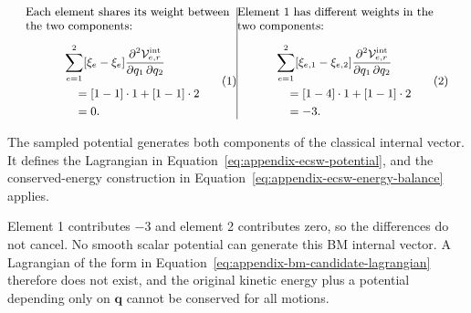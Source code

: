 \documentclass[a4paper,12pt]{article}
\newcommand{\vect}[1]{\boldsymbol{#1}}
\begin{document}
\begin{subequations}
 \label{eq:appendix-structural-compatibility-comparison}
 \noindent
 \begin{minipage}[t]{0.48\linewidth}
  \vspace{0pt}\small\raggedright
  Each element shares its weight between the two components:
  \begin{equation}
   \begin{aligned}
    &\sum_{e=1}^{2}[\xi_e-\xi_e]
      \frac{\partial^2\mathcal V_{e,r}^{\mathrm{int}}}
           {\partial q_1\,\partial q_2}\\
    &\quad=[1-1]\cdot1+[1-1]\cdot2\\
    &\quad=0.
   \end{aligned}
   \label{eq:appendix-structural-classical-compatibility}
  \end{equation}
 \end{minipage}\hfill\vrule width 0.4pt\hfill%
 \begin{minipage}[t]{0.48\linewidth}
  \vspace{0pt}\small\raggedright
  Element 1 has different weights in the two components:
  \begin{equation}
   \begin{aligned}
    &\sum_{e=1}^{2}[\xi_{e,1}-\xi_{e,2}]
      \frac{\partial^2\mathcal V_{e,r}^{\mathrm{int}}}
           {\partial q_1\,\partial q_2}\\
    &\quad=[1-4]\cdot1+[1-1]\cdot2\\
    &\quad=-3.
   \end{aligned}
   \label{eq:appendix-structural-example-compatibility}
  \end{equation}
 \end{minipage}
\end{subequations}

\noindent
\begin{minipage}[t]{0.48\linewidth}
 \vspace{0pt}\small\raggedright
 The sampled potential generates both components of the classical internal vector. It defines the Lagrangian in Equation~\eqref{eq:appendix-ecsw-potential}, and the conserved-energy construction in Equation~\eqref{eq:appendix-ecsw-energy-balance} applies.
\end{minipage}\hfill\vrule width 0.4pt\hfill%
\begin{minipage}[t]{0.48\linewidth}
 \vspace{0pt}\small\raggedright
 Element 1 contributes $-3$ and element 2 contributes zero, so the differences do not cancel. No smooth scalar potential can generate this BM internal vector. A Lagrangian of the form in Equation~\eqref{eq:appendix-bm-candidate-lagrangian} therefore does not exist, and the original kinetic energy plus a potential depending only on $\vect{q}$ cannot be conserved for all motions.
\end{minipage}
\end{document}
